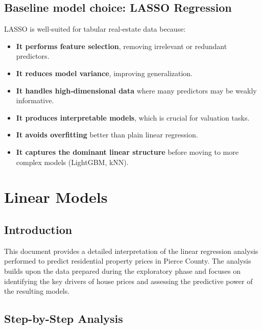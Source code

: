 \documentclass[
  english,
  letterpaper,
  DIV=11,
  numbers=noendperiod]{scrreprt}
\providecommand{\tightlist}{%
  \setlength{\itemsep}{0pt}\setlength{\parskip}{0pt}}
\begin{document}
\section{Baseline model choice: LASSO
Regression}\label{baseline-model-choice-lasso-regression}

LASSO is well‑suited for tabular real‑estate data because:

\begin{itemize}
\tightlist
\item
  \textbf{It performs feature selection}, removing irrelevant or
  redundant predictors.\\
\item
  \textbf{It reduces model variance}, improving generalization.\\
\item
  \textbf{It handles high‑dimensional data} where many predictors may be
  weakly informative.\\
\item
  \textbf{It produces interpretable models}, which is crucial for
  valuation tasks.\\
\item
  \textbf{It avoids overfitting} better than plain linear regression.\\
\item
  \textbf{It captures the dominant linear structure} before moving to
  more complex models (LightGBM, kNN).
\end{itemize}


\chapter{Linear Models}\label{linear-models}

\section{Introduction}\label{introduction}

This document provides a detailed interpretation of the linear
regression analysis performed to predict residential property prices in
Pierce County. The analysis builds upon the data prepared during the
exploratory phase and focuses on identifying the key drivers of house
prices and assessing the predictive power of the resulting models.

\section{Step-by-Step Analysis}\label{step-by-step-analysis}
\end{document}
